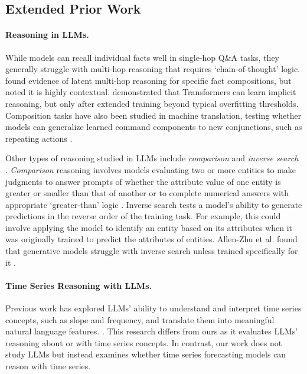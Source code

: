 \subsection{Extended Prior Work}\label{apd:extend_prior_work}

\paragraph{Reasoning in LLMs.} While models can recall individual facts well in single-hop Q\&A tasks, they generally struggle with multi-hop reasoning that requires `chain-of-thought' logic. \citet{soheeyang2024multihopreasoning} found evidence of latent multi-hop reasoning for specific fact compositions, but noted it is highly contextual. \citet{wang2024grokked} demonstrated that Transformers can learn implicit reasoning, but only after extended training beyond typical overfitting thresholds. Composition tasks have also been studied in machine translation, testing whether models can generalize learned command components to new conjunctions, such as repeating actions \citep{lake2018generalization}.

Other types of reasoning studied in LLMs include \textit{comparison} and \textit{inverse search} \citep{allenshu2023physics3.2, wang2024grokked}.  \textit{Comparison} reasoning involves models evaluating two or more entities to make judgments to answer prompts of whether the attribute value of one entity is greater or smaller than that of another \citep{allenshu2023physics3.2, wang2024grokked} or to complete numerical answers with appropriate `greater-than' logic \cite{hanna2023gptgreaterthan}. Inverse search tests a model's ability to generate predictions in the reverse order of the training task. For example, this could involve applying the model to identify an entity based on its attributes when it was originally trained to predict the attributes of entities. Allen-Zhu et al. found that generative models struggle with inverse search unless trained specifically for it \citep{allenshu2023physics3.2}.

\paragraph{Time Series Reasoning with LLMs.} Previous work has explored LLMs' ability to understand and interpret time series concepts, such as slope and frequency, and translate them into meaningful natural language features. \citep{cai2024timeseriesexam, chow2024llmstimeseriesreasoning}. This research differs from ours as it evaluates LLMs' reasoning about or with time series concepts. In contrast, our work does not study LLMs but instead examines whether time series forecasting models can reason with time series.


